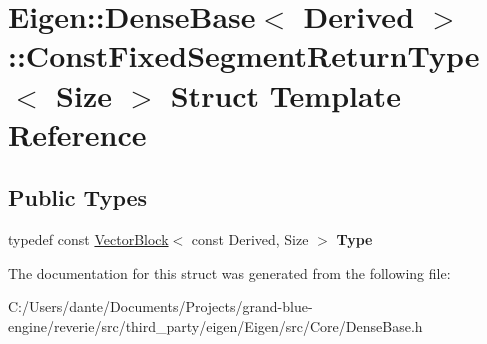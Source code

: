 \hypertarget{struct_eigen_1_1_dense_base_1_1_const_fixed_segment_return_type}{}\section{Eigen\+::Dense\+Base$<$ Derived $>$\+::Const\+Fixed\+Segment\+Return\+Type$<$ Size $>$ Struct Template Reference}
\label{struct_eigen_1_1_dense_base_1_1_const_fixed_segment_return_type}
\subsection*{Public Types}
\begin{DoxyCompactItemize}
\item 
\mbox{\label{struct_eigen_1_1_dense_base_1_1_const_fixed_segment_return_type_a8ff59e0bd4c81ec0f2f2e608fbfedfef}} 
typedef const \mbox{\hyperlink{class_eigen_1_1_vector_block}{Vector\+Block}}$<$ const Derived, Size $>$ {\bfseries Type}
\end{DoxyCompactItemize}


The documentation for this struct was generated from the following file\+:\begin{DoxyCompactItemize}
\item 
C\+:/\+Users/dante/\+Documents/\+Projects/grand-\/blue-\/engine/reverie/src/third\+\_\+party/eigen/\+Eigen/src/\+Core/Dense\+Base.\+h\end{DoxyCompactItemize}

